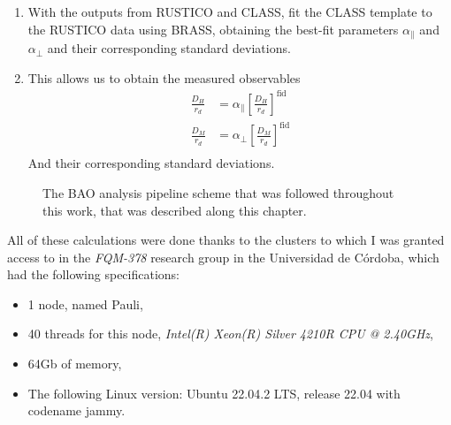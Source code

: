 \begin{enumerate}
\item With the outputs from RUSTICO and CLASS, fit the CLASS template to the RUSTICO data using BRASS, obtaining the best-fit parameters $\alpha_\parallel$ and $\alpha_\perp$ and their corresponding standard deviations.
\item This allows us to obtain the measured observables 
\begin{align}
	\frac{D_H}{r_d} &= \alpha_\parallel \left[ \frac{D_H}{r_d} \right]^\text{fid} \\
	\frac{D_M}{r_d} &= \alpha_\perp \left[ \frac{D_M}{r_d} \right]^\text{fid} \\
\end{align}
And their corresponding standard deviations.

\end{enumerate}



\begin{figure}[b]
    \centering
    \caption[The BAO analysis pipeline schematic]{The BAO analysis pipeline scheme that was  followed throughout this work, that was described along this chapter. }
    \label{fig:pipeline}
\end{figure}
All of these calculations were done thanks to the clusters to which I was granted access to in the \textit{FQM-378} research group in the Universidad de Córdoba, which had the following specifications: 
\begin{itemize}
	\item 1 node, named Pauli,
\item 40 threads for this node, \textit{Intel(R) Xeon(R) Silver 4210R CPU @ 2.40GHz},
\item 64Gb of memory,
\item The following Linux version: Ubuntu 22.04.2 LTS, release 22.04 with codename jammy.
\end{itemize}
